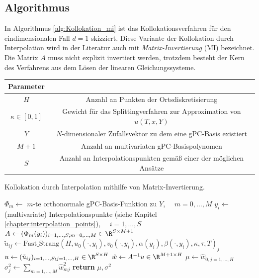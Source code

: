\subsection{Algorithmus}
In Algorithmus \ref{alg:Kollokation_mi} ist das Kollokationsverfahren für den eindimensionalen Fall $d=1$ skizziert. Diese Variante der Kollokation durch Interpolation wird in der Literatur auch mit \emph{Matrix-Invertierung} (MI) bezeichnet. Die Matrix $A$ muss nicht explizit invertiert werden, trotzdem besteht der Kern des Verfahrens aus dem Lösen der linearen Gleichungssysteme.\\
\begin{tabular}{c|c}
Parameter & \\
\hline
$H$ & Anzahl an Punkten der Ortsdiskretisierung\\
$\kappa\in [0,1]$ & Gewicht für das Splittingverfahren zur Approximation von $u(T,x,Y)$\\
$Y$ & $N$-dimensionaler Zufallsvektor zu dem eine gPC-Basis existiert\\
$M+1$ & Anzahl an multivariaten gPC-Basispolynomen\\
$S$ & Anzahl an Interpolationspunkten gemäß einer der möglichen Ansätze
\end{tabular}
\begin{algorithm}[ht]
    \caption{Kollokation durch Interpolation mithilfe von Matrix-Invertierung.}
    \label{alg:Kollokation_mi}
    \begin{algorithmic}[1] %
            \State $\Phi_m\gets$ $m$-te orthonormale gPC-Basis-Funktion zu $Y$, $\quad m=0,\dots,M$
            \State $y_i\gets$ (multivariate) Interpolationspunkte (siehe Kapitel \ref{chapter:interpolation_points}), $\quad i=1,\dots,S$
            \State $A\gets (\Phi_m(y_i))_{i=1,\dots,S;m=0,\dots,M}\in\R^{S\times M+1}$
           		\State $\tilde{u}_{ij}\gets \text{Fast\_Strang}(H,u_0(\cdot, y_i),v_0(\cdot, y_i),\alpha(y_i),\beta(\cdot, y_i),\kappa,\tau,T)_j$
           	\EndFor
            \State $u\gets (\tilde{u}_{ij})_{i=1,\dots,S;j=1,\dots,H}\in\R^{S\times H}$
            \State $\hat{w}\gets A^{-1}u\in\R^{M+1\times H}$
            \State {}
			\State $\mu\gets \hat{w}_{0,j=1,\dots,H}$ 
			\State $\sigma^2_j\gets \sum_{m=1,\dots,M}\hat{w}^2_{mj}$
			\State \textbf{return} $\mu,\sigma^2$         
        \EndFunction
    \end{algorithmic}
\end{algorithm}
